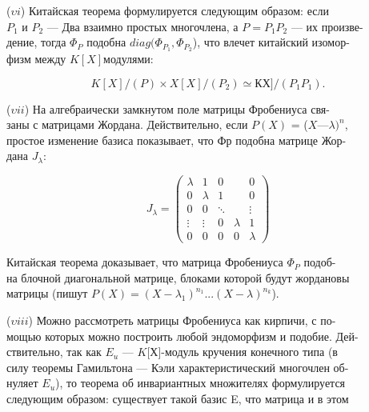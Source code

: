 \medskip

($\upsilon\mathit {i} $) Китайская теорема формулируется следующим образом: если\\ $P_1$ и $P_2$ — Два взаимно простых многочлена, а $P=P_1P_2$ — их произве-\\дение, тогда $ \Phi_P$ подобна $diag( \Phi_{P_1},\Phi_{P_2}$), что влечет китайский изомор-\\физм между $K[X]$модулями: 

\medskip

$$K[X]/(P) \times X[X]/(P_2) \simeq КХ]/(P_1P_1).$$ 

\medskip

($\upsilon\mathit{ii} $) На алгебраически замкнутом поле матрицы Фробениуса свя-\\заны с матрицами Жордана. Действительно, если $P(X)$ = ($X — \lambda)^n$,\\простое изменение базиса показывает, что Фр подобна матрице 
Жор-\\дана $J_{\lambda}$:

$$J_{\lambda} = \begin{pmatrix}
\lambda & 1 & 0 & \; & 0 \\
0 & \lambda & 1 & \; & 0 \\
0 & 0 & \ddots & \; & \vdots \\
\vdots & \vdots & 0 & \lambda & 1 \\
0 & 0 & 0 & 0 & \lambda
\end{pmatrix}
$$

\medskip

\noindent Китайская теорема доказывает, что матрица Фробениуса $\Phi_P$ 
подоб-\\на блочной диагональной матрице, блоками которой будут жордановы\\ матрицы (пишут $P(X) = (X-\lambda_1)^{n_1}...(X - \lambda)^{n_k}$).

\medskip

($\upsilon\mathit{iii} $) Можно рассмотреть матрицы Фробениуса как кирпичи, с по-\\мощью которых можно построить любой эндоморфизм и подобие. Дей-\\ствительно, так как $E_u$ — $\mathit{K}$[Х]-модуль кручения конечного типа (в\\силу теоремы Гамильтона — Кэли характеристический многочлен об-\\нуляет $E_u$), то теорема об инвариантных множителях формулируется\\ следующим образом: существует такой базис E, что матрица и в этом

